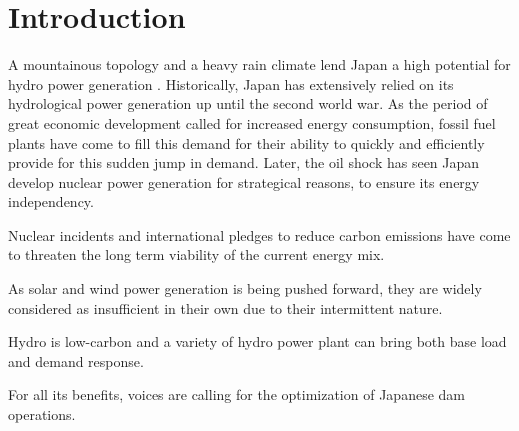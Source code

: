 \documentclass{article}
\begin{document}


\section{Introduction}
\label{sec:Introduction}

A mountainous topology and a heavy rain climate lend Japan a high potential for hydro power generation \cite{}.
Historically\cite{}, Japan has extensively relied on its hydrological power generation up until the second world war.
As the period of great economic development called for increased energy consumption,
fossil fuel plants have come to fill this demand for their ability to quickly and efficiently provide for this sudden jump in demand.
Later, the oil shock has seen Japan develop nuclear power generation for strategical reasons, to ensure its energy independency.

Nuclear incidents and international pledges to reduce carbon emissions have come to threaten the long term viability of the current energy mix.

As solar and wind power generation is being pushed forward,
they are widely considered as insufficient in their own due to their intermittent nature. \cite{}

Hydro is low-carbon and a variety of hydro power plant can bring both base load and demand response.

For all its benefits, voices are calling for the optimization of Japanese dam operations. \cite{}
\end{document}
